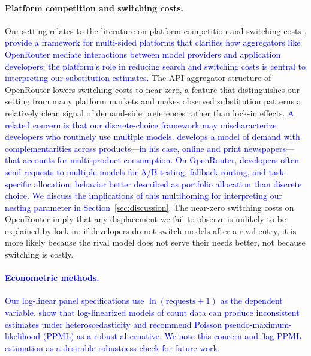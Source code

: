 \documentclass[11pt, a4paper]{article}
\begin{document}
\paragraph{Platform competition and switching costs.} Our setting relates to the literature on platform competition \citep{rietveld2021platform} and switching costs \citep{farrell2007coordination}. \textcolor{blue}{\citet{hagiu2015multi} provide a framework for multi-sided platforms that clarifies how aggregators like OpenRouter mediate interactions between model providers and application developers; the platform's role in reducing search and switching costs is central to interpreting our substitution estimates.} The API aggregator structure of OpenRouter lowers switching costs to near zero, a feature that distinguishes our setting from many platform markets and makes observed substitution patterns a relatively clean signal of demand-side preferences rather than lock-in effects. \textcolor{blue}{A related concern is that our discrete-choice framework may mischaracterize developers who routinely use multiple models. \citet{gentzkow2007valuing} develops a model of demand with complementarities across products---in his case, online and print newspapers---that accounts for multi-product consumption. On OpenRouter, developers often send requests to multiple models for A/B testing, fallback routing, and task-specific allocation, behavior better described as portfolio allocation than discrete choice. We discuss the implications of this multihoming for interpreting our nesting parameter in Section~\ref{sec:discussion}.} The near-zero switching costs on OpenRouter imply that any displacement we fail to observe is unlikely to be explained by lock-in: if developers do not switch models after a rival entry, it is more likely because the rival model does not serve their needs better, not because switching is costly.

\textcolor{blue}{\paragraph{Econometric methods.} Our log-linear panel specifications use $\ln(\text{requests} + 1)$ as the dependent variable. \citet{santossilva2006log} show that log-linearized models of count data can produce inconsistent estimates under heteroscedasticity and recommend Poisson pseudo-maximum-likelihood (PPML) as a robust alternative. We note this concern and flag PPML estimation as a desirable robustness check for future work.}

\end{document}
